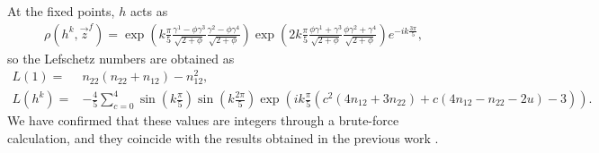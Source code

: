 \documentclass[11pt]{article}
\begin{document}
At the fixed points, $h$ acts as
\begin{align}
    \rho(h^k,\vec{z}^f)=\exp(k\frac{\pi}{5} \frac{\gamma^1 -\phi \gamma^3}{\sqrt{2+ \phi} } \frac{\gamma^2 -\phi \gamma^4}{\sqrt{2+ \phi} }  ) \exp(2k\frac{\pi}{5} \frac{\phi \gamma^1 + \gamma^3}{\sqrt{2+ \phi} } \frac{\phi \gamma^2 +\gamma^4}{\sqrt{2+ \phi} }  ) 
e^{-i k\frac{3\pi}{5}},
\end{align}
so the Lefschetz numbers are obtained as
\begin{align}
    L(1)= &n_{22}(n_{22}+n_{12})-n_{12}^2, \\
    L(h^k)=&-\frac{4}{5} \sum_{c=0}^4\sin( k\frac{\pi }{5}) \sin( k\frac{2\pi }{5})   \exp(ik\frac{\pi }{5}( c^2(4n_{12} +3n_{22}) +c (4n_{12} -n_{22}-2u) -3) ).
\end{align}
We have confirmed that these values are integers through a brute-force calculation, and they coincide
with the results obtained in the previous work \cite{Kikuchi:2022psj}. 
\end{document}
